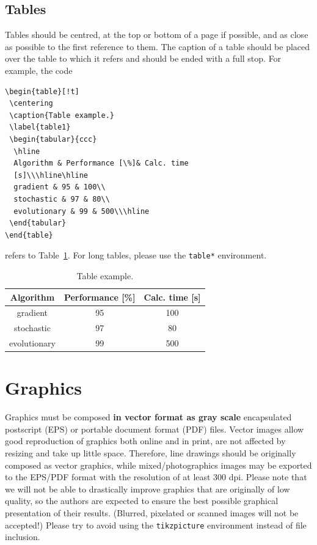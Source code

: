 \documentclass{amcs}
\begin{document}
\subsection{Tables}
%
Tables should be centred, at the top or bottom of a page if possible, and as close as possible to the first reference to them. The caption of a table should be placed over the table to which it refers and should be ended with a full stop. For example, the code
%
{\small\begin{verbatim}
\begin{table}[!t]
 \centering
 \caption{Table example.}
 \label{table1}
 \begin{tabular}{ccc}
  \hline
  Algorithm & Performance [\%]& Calc. time
  [s]\\\hline\hline
  gradient & 95 & 100\\
  stochastic & 97 & 80\\
  evolutionary & 99 & 500\\\hline
 \end{tabular}
\end{table}
\end{verbatim}}
\noindent refers to Table~\ref{table1}. For long tables, please use the \verb+table*+ environment.
%
\begin{table}[!t]
 \centering
 \caption{Table example.}
 \label{table1}
 \begin{tabular}{ccc}
   \hline
   Algorithm & Performance [\%]& Calc. time [s]\\\hline
   gradient & 95 & 100\\
   stochastic & 97 & 80\\
   evolutionary & 99 & 500\\\hline
 \end{tabular}
\end{table}

\section{Graphics}
Graphics must be composed \textbf{in vector format as gray scale} encapsulated postscript (EPS) or portable document format (PDF) files. Vector images allow good reproduction of graphics both online and in print, are not affected by resizing and take up little space. Therefore, line drawings should be originally composed as vector graphics, while mixed/photographics images may be exported to the EPS/PDF format with the resolution of at least 300 dpi. Please note that we will not be able to drastically improve graphics that are originally of low quality, so the authors are expected to ensure the best possible graphical presentation of their results. (Blurred, pixelated or scanned images will not be accepted!) Please try to avoid using the \verb+tikzpicture+ environment instead of file inclusion.
\end{document}
